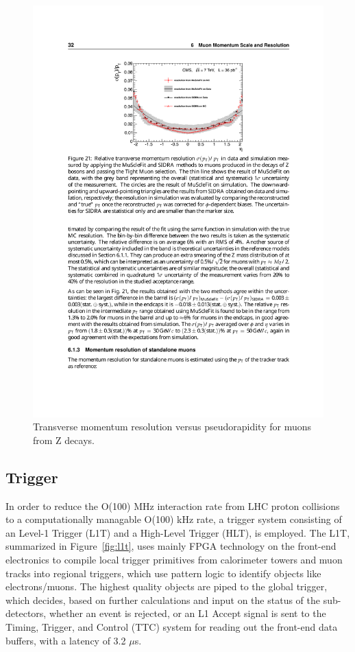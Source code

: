 \begin{figure}[tbh]
\centering
\includegraphics[width=5in]{figures/muonres.pdf}
\caption{Transverse momentum resolution versus pseudorapidity for muons from Z decays.}
\label{fig:muonres}
\end{figure}

\subsection{Trigger}

In order to reduce the O(100) MHz interaction rate from LHC proton collisions to a computationally managable O(100) kHz rate, a trigger system consisting of an Level-1 Trigger (L1T) and a High-Level Trigger (HLT), is employed. The L1T, summarized in Figure~\ref{fig:l1t}, uses mainly FPGA technology on the front-end electronics to compile local trigger primitives from calorimeter towers and muon tracks into regional triggers, which use pattern logic to identify objects like electrons/muons. The highest quality objects are piped to the global trigger, which decides, based on further calculations and input on the status of the sub-detectors, whether an event is rejected, or an L1 Accept signal is sent to the Timing, Trigger, and Control (TTC) system for reading out the front-end data buffers, with a latency of 3.2 $\mu$s.

